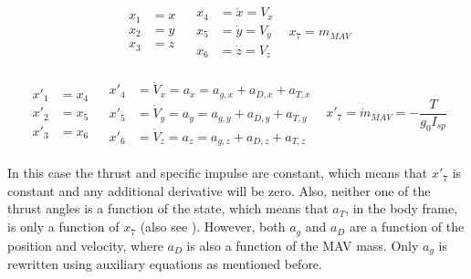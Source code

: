 \begin{align} \label{eq:stateX}
\begin{split} 
x_{1}&=x\\
x_{2}&=y\\
x_{3}&=z
\end{split} 
&
\begin{split}
x_{4}&=\dot{x}=V_{x}\\
x_{5}&=\dot{y}=V_{y}\\
x_{6}&=\dot{z}=V_{z}
\end{split}
&
x_{7}=m_{MAV}
\end{align}


\begin{align} \label{eq:state_derivativesX}
\begin{split} 
x'_{1}&=x_{4}\\
x'_{2}&=x_{5}\\
x'_{3}&=x_{6}
\end{split} 
&
\begin{split}
x'_{4}&=\dot{V}_{x}=a_{x}=a_{g,x}+a_{D,x}+a_{T,x}\\
x'_{5}&=\dot{V}_{y}=a_{y}=a_{g,y}+a_{D,y}+a_{T,y}\\
x'_{6}&=\dot{V}_{z}=a_{z}=a_{g,z}+a_{D,z}+a_{T,z}
\end{split}
&
x'_{7}=\dot{m}_{MAV}=-\dfrac{T}{g_{0}I_{sp}}
\end{align}


In this case the thrust and specific impulse are constant, which means that $x'_{7}$ is constant and any additional derivative will be zero. Also, neither one of the thrust angles is a function of the state, which means that $a_{T}$, in the body frame, is only a function of $x_{7}$ (also see ). However, both $a_{g}$ and $a_{D}$ are a function of the position and velocity, where $a_{D}$ is also a function of the \ac{MAV} mass. Only $a_{g}$ is rewritten using auxiliary equations as mentioned before. 







